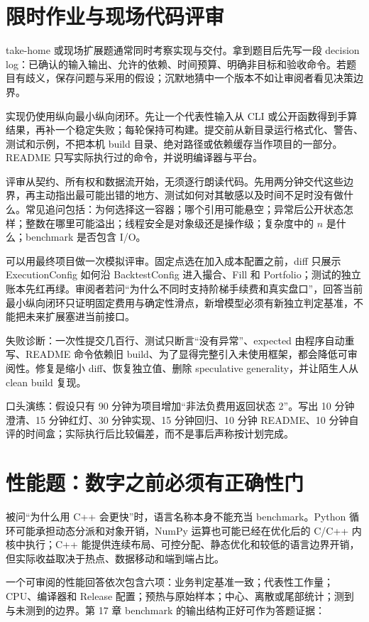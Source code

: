 \section{限时作业与现场代码评审}

take-home 或现场扩展题通常同时考察实现与交付。拿到题目后先写一段 decision log：已确认的输入输出、允许的依赖、时间预算、明确非目标和验收命令。若题目有歧义，保存问题与采用的假设；沉默地猜中一个版本不如让审阅者看见决策边界。

实现仍使用纵向最小纵向闭环。先让一个代表性输入从 CLI 或公开函数得到手算结果，再补一个稳定失败；每轮保持可构建。提交前从新目录运行格式化、警告、测试和示例，不把本机 build 目录、绝对路径或依赖缓存当作项目的一部分。README 只写实际执行过的命令，并说明编译器与平台。

评审从契约、所有权和数据流开始，无须逐行朗读代码。先用两分钟交代这些边界，再主动指出最可能出错的地方、测试如何对其敏感以及时间不足时没有做什么。常见追问包括：为何选择这一容器；哪个引用可能悬空；异常后公开状态怎样；整数在哪里可能溢出；线程安全是对象级还是操作级；复杂度中的 \(n\) 是什么；benchmark 是否包含 I/O。

可以用最终项目做一次模拟评审。固定点选在加入成本配置之前，diff 只展示 ExecutionConfig 如何沿 BacktestConfig 进入撮合、Fill 和 Portfolio；测试的独立账本先红再绿。审阅者若问“为什么不同时支持阶梯手续费和真实盘口”，回答当前最小纵向闭环只证明固定费用与确定性滑点，新增模型必须有新独立判定基准，不能把未来扩展塞进当前接口。

失败诊断：一次性提交几百行、测试只断言“没有异常”、expected 由程序自动重写、README 命令依赖旧 build、为了显得完整引入未使用框架，都会降低可审阅性。修复是缩小 diff、恢复独立值、删除 speculative generality，并让陌生人从 clean build 复现。

口头演练：假设只有 90 分钟为项目增加“非法负费用返回状态 2”。写出 10 分钟澄清、15 分钟红灯、30 分钟实现、15 分钟回归、10 分钟 README、10 分钟自评的时间盒；实际执行后比较偏差，而不是事后声称按计划完成。

\section{性能题：数字之前必须有正确性门}

被问“为什么用 C++ 会更快”时，语言名称本身不能充当 benchmark。Python 循环可能承担动态分派和对象开销，NumPy 运算也可能已经在优化后的 C/C++ 内核中执行；C++ 能提供连续布局、可控分配、静态优化和较低的语言边界开销，但实际收益取决于热点、数据移动和端到端占比。

一个可审阅的性能回答依次包含六项：业务判定基准一致；代表性工作量；CPU、编译器和 Release 配置；预热与原始样本；中心、离散或尾部统计；测到与未测到的边界。第 17 章 benchmark 的输出结构正好可作为答题证据：

